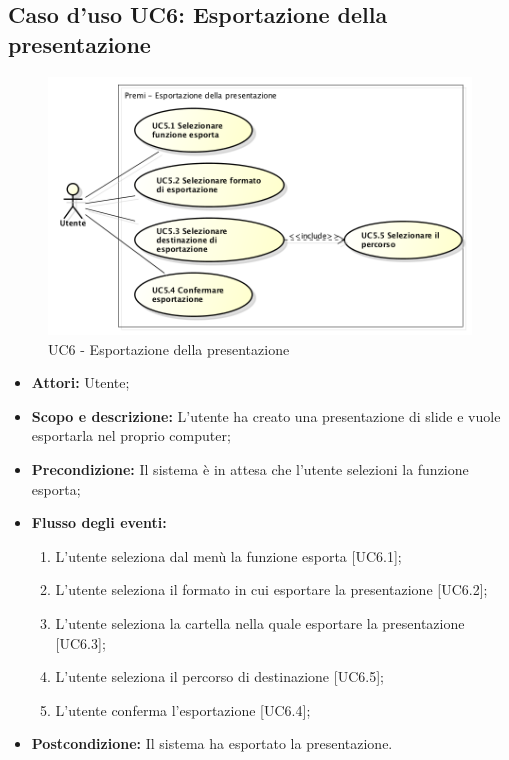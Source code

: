 \subsection{Caso d'uso UC6: Esportazione della presentazione}
	\begin{figure}[h]
		\centering
		\includegraphics[scale=0.45] {img/UC6.png}
		\caption{UC6 - Esportazione della presentazione}
	\end{figure}

	\begin{itemize}
		\item \textbf{Attori:} Utente;
		\item \textbf{Scopo e descrizione:} L'utente ha creato una presentazione di slide e vuole esportarla nel proprio computer;
		\item \textbf{Precondizione:} Il sistema è in attesa che l'utente selezioni la funzione esporta;
		\item \textbf{Flusso degli eventi:}
		\begin{enumerate}
			\item L'utente seleziona dal menù la funzione esporta [UC6.1];
			\item L'utente seleziona il formato in cui esportare la presentazione [UC6.2];
			\item L'utente seleziona la cartella nella quale esportare la presentazione [UC6.3];
			\item L'utente seleziona il percorso di destinazione [UC6.5];
			\item L'utente conferma l'esportazione [UC6.4];
		\end{enumerate}
		\item \textbf{Postcondizione:} Il sistema ha esportato la presentazione.
	\end{itemize}



